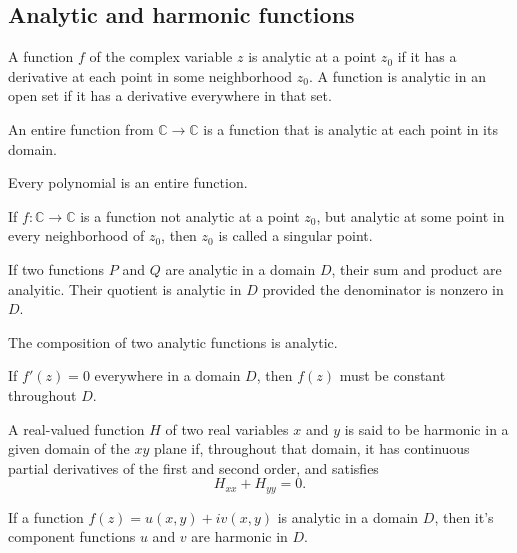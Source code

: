 \documentclass{article}
\begin{document}
\subsection{Analytic and harmonic functions}
\begin{definition}
	A function \(f\) of the complex variable \(z\) is analytic at a point \(z_0\) if it has a derivative at each point in some neighborhood \(z_0\). A function is analytic in an open set if it has a derivative everywhere in that set.
\end{definition}
\begin{definition}
	An entire function from \(\mathbb{C}\rightarrow \mathbb{C}\) is a function that is analytic at each point in its domain.
\end{definition}
\begin{remark}
	Every polynomial is an entire function.
\end{remark}
\begin{definition}
	If \(f:\mathbb{C}\rightarrow\mathbb{C}\) is a function not analytic at a point \(z_0\), but analytic at some point in every neighborhood of \(z_0\), then \(z_0\) is called a singular point.
\end{definition}
\begin{proposition}
	If two functions \(P\) and \(Q\) are analytic in a domain \(D\), their sum and product are analyitic. Their quotient is analytic in \(D\) provided the denominator is nonzero in \(D\).
\end{proposition}
\begin{proposition}
	The composition of two analytic functions is analytic.
\end{proposition}
\begin{theorem}
	If \(f'(z)=0\) everywhere in a domain \(D\), then \(f(z)\) must be constant throughout \(D\).
\end{theorem}
\begin{definition}[Harmonic]
	A real-valued function \(H\) of two real variables \(x\) and \(y\) is said to be harmonic in a given domain of the \(xy\) plane if, throughout that domain, it has continuous partial derivatives of the first and second order, and satisfies
	\begin{equation*}
		H_{xx}+H_{yy}=0.
	\end{equation*}
\end{definition}
\begin{theorem}
	If a function \(f(z)=u(x,y)+iv(x,y)\) is analytic in a domain \(D\), then it's component functions \(u\) and \(v\) are harmonic in \(D\).
\end{theorem}
\end{document}
